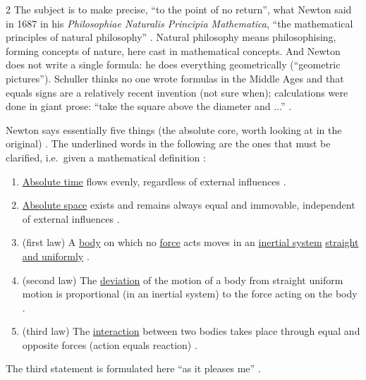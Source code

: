 \begin{paracol}{2}
The subject is to make precise, ``to the point of no return'', what Newton said in 1687 in his
\emph{Philosophiae Naturalis Principia Mathematica}, ``the mathematical principles of natural philosophy''
. Natural philosophy means philosophising, forming concepts
of nature, here cast in mathematical concepts. And Newton does not write a single formula: he does everything
geometrically (``geometric pictures''). Schuller thinks no one wrote formulas in the Middle Ages and that
equals signs are a relatively recent invention (not sure when); calculations were done in giant prose: ``take the
square above the diameter and ...'' .

Newton says essentially five things (the absolute core, worth looking at in the original) .
The underlined words in the following are the ones that must be clarified, i.e.\ given a mathematical definition
:

\begin{definition}\label{def:bv-newton}
\begin{enumerate}
  \item \underline{Absolute time} flows evenly, regardless of external influences .
  \item \underline{Absolute space} exists and remains always equal and immovable, independent of external influences
        .
  \item (first law) A \underline{body} on which no \underline{force} acts moves in an \underline{inertial system}
        \underline{straight and uniformly} .
  \item (second law) The \underline{deviation} of the motion of a body from straight uniform motion is proportional
        (in an inertial system) to the force acting on the body .
  \item (third law) The \underline{interaction} between two bodies takes place through equal and opposite forces
        (action equals reaction) .
\end{enumerate}
\end{definition}
The third statement is formulated here ``as it pleases me'' .


\end{paracol}
